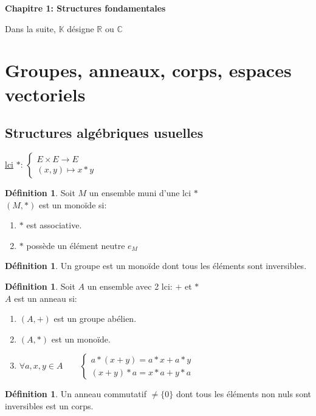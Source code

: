 \documentclass[10pt,a4paper]{article}
\theoremstyle{definition}
\newtheorem{definition}[proposition]{Définition}
\begin{document}
\renewcommand{\labelitemi}{$*$}
\begin{center}
{\Large \textbf{Chapitre 1: Structures fondamentales}}
\end{center}
Dans la suite, $\mathbb{K}$ désigne $\mathbb{R}$ ou $\mathbb{C}$

\section{Groupes, anneaux, corps, espaces vectoriels}
\subsection{Structures algébriques usuelles}
\uline{lci} $*$: $\begin{cases}
E \times E \to E \\
(x, y) \mapsto x * y
\end{cases}$
\begin{definition}
Soit $M$ un ensemble muni d'une lci $*$ \\
$(M, *)$ est un monoïde si:
\begin{enumerate}
\item $*$ est associative.
\item $*$ possède un élément neutre $e_M$
\end{enumerate}
\end{definition}
\begin{definition}
Un groupe est un monoïde dont tous les éléments sont inversibles.
\end{definition}
\begin{definition}
Soit $A$ un ensemble avec 2 lci: $+$ et $*$ \\
$A$ est un anneau si:
\begin{enumerate}
\item $(A, +)$ est un groupe abélien.
\item $(A, *)$ est un monoïde.
\item $\forall a, x, y \in A \qquad \begin{cases}
a * (x + y) = a * x + a * y \\
(x + y) * a = x * a + y * a
\end{cases}$
\end{enumerate}
\end{definition}
\begin{definition}
Un anneau commutatif $\neq \{ 0 \}$ dont tous les éléments non nuls sont inversibles est un corps.
\end{definition}
\end{document}
